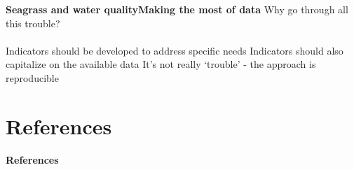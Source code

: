 \documentclass[serif]{beamer}\usepackage[]{graphicx}\usepackage[]{color}
\begin{document}
\begin{frame}{\textbf{Seagrass and water quality}}{\textbf{Making the most of data}}
Why go through all this trouble? \\~\\
Indicators should be developed to address specific needs 
Indicators should also capitalize on the available data
It's not really `trouble' - the approach is reproducible
\end{frame}

\section{References}
\begin{frame}[allowframebreaks,t]{\textbf{References}}
\tiny
{}


\end{frame}
\end{document}

